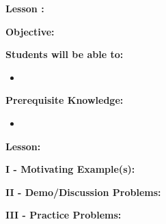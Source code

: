 \documentclass[12pt]{article}
\theoremstyle{definition}
\begin{document}
{\bf \large Lesson : }
\hfill \doclicenseImage[imagewidth=5em]\\
\par
{\bf Objective:} \\
\par
{\bf Students will be able to:}
\begin{itemize}
	\item \
\end{itemize}
{\bf Prerequisite Knowledge:}
\begin{itemize}
	\item \
\end{itemize}
\hrulefill

{\bf Lesson:}
\par
{\bf I - Motivating Example(s):}
\par
{\bf II - Demo/Discussion Problems:}
\par
{\bf III - Practice Problems:}
\end{document}
